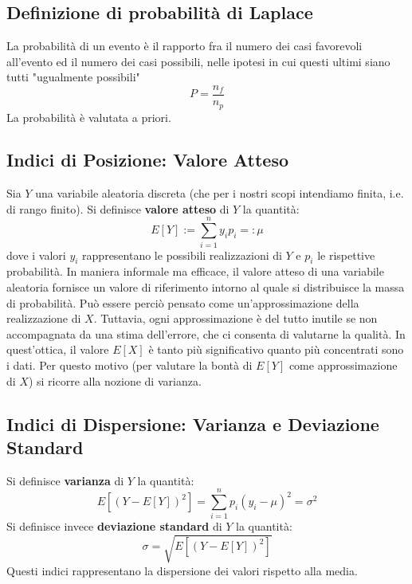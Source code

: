 \subsection{Definizione di probabilità di Laplace}
La probabilità di un evento è il rapporto fra il numero dei casi favorevoli all'evento ed il numero dei casi possibili, nelle ipotesi in cui questi ultimi siano tutti "ugualmente possibili"
\begin{equation}
	P=\frac{n_f}{n_p}
\end{equation}
La probabilità è valutata a priori.


\subsection{Indici di Posizione: Valore Atteso}
Sia $Y$ una variabile aleatoria discreta (che per i nostri scopi intendiamo finita, i.e. di rango finito). Si definisce \textbf{valore atteso} di $Y$ la quantità:
\begin{equation}
	E[Y] := \sum_{i=1}^{n} y_i p_i =: \mu
\end{equation}
dove i valori $y_i$ rappresentano le possibili realizzazioni di $Y$ e $p_i$ le rispettive probabilità. In maniera informale ma efficace, il valore atteso di una variabile aleatoria fornisce un valore di riferimento intorno al quale si distribuisce la massa di probabilità. Può essere perciò pensato come un'approssimazione della realizzazione di $X$. Tuttavia, ogni approssimazione è del tutto inutile se non accompagnata da una stima dell'errore, che ci consenta di valutarne la qualità. In quest'ottica, il valore $E[X]$ è tanto più significativo quanto più concentrati sono i dati. Per questo motivo (per valutare la bontà di $E[Y]$ come approssimazione di $X$) si ricorre alla nozione di varianza.



\subsection{Indici di Dispersione: Varianza e Deviazione Standard}
Si definisce \textbf{varianza} di $Y$ la quantità:
\begin{equation}
    E[(Y-E[Y])^2]= \sum_{i=1}^{n}p_i(y_i - \mu)^2 = \sigma^2
\end{equation}
Si definisce invece \textbf{deviazione standard} di $Y$ la quantità:
\begin{equation}
    \sigma = \sqrt{E[(Y-E[Y])^2]}
\end{equation}
Questi indici rappresentano la dispersione dei valori rispetto alla media.

